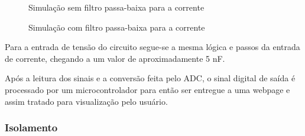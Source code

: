\begin{figure}[htb!]
    \caption{Simulação sem filtro passa-baixa para a corrente}
    \label{fig:simco1}
    \fonte{}
\end{figure}

\begin{figure}[htb!]
    \caption{Simulação com filtro passa-baixa para a corrente}
    \label{fig:simco2}
    \fonte{}
\end{figure}

Para a entrada de tensão do circuito segue-se a mesma lógica e passos da entrada de corrente, chegando a um valor de aproximadamente 5 nF.

Após a leitura dos sinais e a conversão feita pelo ADC, o sinal digital de saída é processado por um microcontrolador para então ser entregue a uma webpage e assim tratado para visualização pelo usuário. 

\subsubsection{Isolamento}\label{isolamento-metodologia}

